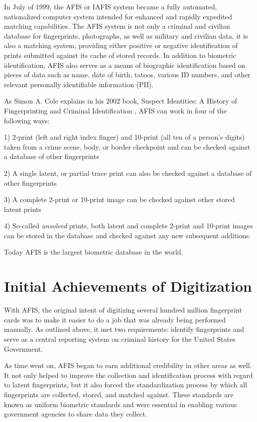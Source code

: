 \documentclass[sigconf]{acmart}
\begin{document}
In July of 1999, the AFIS or IAFIS system became a fully automated, nationalized computer system intended for enhanced and rapidly expedited matching capabilities. The AFIS system is not only a criminal and civilian database for fingerprints, photographs, as well as military and civilian data, it is also a matching system, providing either positive or negative identification of prints submitted against its cache of stored records. In addition to biometric identification, AFIS also serves as a means of biographic identification based on pieces of data such as name, date of birth, tatoos, various ID numbers, and other relevant personally identifiable information (PII). 

As Simon A. Cole explains in his 2002 book, Suspect Identities: A History of Fingerprinting and Criminal Identification \cite{Cole2002}, AFIS can work in four of the following ways:

1) 2-print (left and right index finger) and 10-print (all ten of a person's digits) taken from a crime scene, body, or border checkpoint and can be checked against a database of other fingerprints

2) A single latent, or partial trace print can also be checked against a database of other fingerprints

3) A complete 2-print or 10-print image can be checked against other stored latent prints

4) So-called {\em unsolved} prints, both latent and complete 2-print and 10-print images can be stored in the database and checked against any new subsequent additions.

Today AFIS is the largest biometric database in the world.

\section{Initial Achievements of Digitization}

With AFIS, the original intent of digitizing several hundred million fingerprint cards was to make it easier to do a job that was already being performed manually. As outlined above, it met two requirements: identify fingerprints and serve as a central reporting system on criminal history for the United States Government. 

As time went on, AFIS began to earn additional credibility in other areas as well. It not only helped to improve the collection and identification process with regard to latent fingerprints, but it also forced the standardization process by which all fingerprints are collected, stored, and matched against. These standards are known as uniform biometric standards and were essential in enabling various government agencies to share data they collect. 
\end{document}
